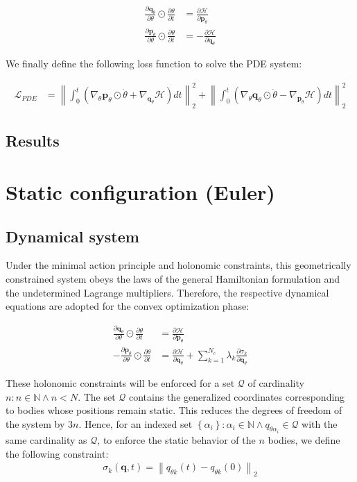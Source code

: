 \documentclass[draft]{agujournal2019}
\newcommand{\norm}[1]{\left\lVert#1\right\rVert}
\begin{document}
\begin{align}
    \frac{\partial \mathbf{q}_\theta}{\partial \theta} \odot \frac{\partial \theta}{\partial t} &= \frac{\partial \mathcal{H}}{\partial \mathbf{p}_\theta} \\
    \frac{\partial \mathbf{p}_\theta}{\partial \theta} \odot \frac{\partial \theta}{\partial t} &= - \frac{\partial \mathcal{H}}{\partial \mathbf{q}_\theta}
\end{align}

We finally define the following loss function to solve the PDE system:

\begin{align}
    \mathcal{L}_{PDE} &= \norm{\int_0^t \left(\nabla_\theta \mathbf{p}_\theta \odot \dot{\theta} + \nabla_{\mathbf{q}_\theta} \mathcal{H}\right) dt}_2^2 + \norm{\int_0^t \left(\nabla_\theta \mathbf{q}_\theta \odot \dot{\theta} - \nabla_{\mathbf{p}_\theta} \mathcal{H}\right) dt}^2_2
\end{align}

\subsection{Results}

\section{Static configuration (Euler)}
\subsection{Dynamical system}
Under the minimal action principle and holonomic constraints, this geometrically constrained system obeys the laws of the general Hamiltonian formulation and the undetermined Lagrange multipliers. Therefore, the respective dynamical equations are adopted for the convex optimization phase:

\begin{align}
    \frac{\partial \mathbf{q}_\theta}{\partial \theta} \odot \frac{\partial \theta}{\partial t} &= \frac{\partial \mathcal{H}}{\partial \mathbf{p}_\theta} \\
    - \frac{\partial \mathbf{p}_\theta}{\partial \theta} \odot \frac{\partial \theta}{\partial t} &= \frac{\partial \mathcal{H}}{\partial \mathbf{q}_\theta} + \sum_{k = 1}^{N_c} \lambda_k \frac{\partial \sigma_k}{\partial \mathbf{q}_\theta}
\end{align}

These holonomic constraints will be enforced for a set $\mathcal{Q}$ of cardinality $n \colon n \in \mathbb{N} \wedge n < N$. The set $\mathcal{Q}$ contains the generalized coordinates corresponding to bodies whose positions remain static. This reduces the degrees of freedom of the system by $3n$. Hence, for an indexed set $\left\{\alpha_i\right\} \colon \alpha_i \in \mathbb{N} \wedge q_{\theta\alpha_i} \in \mathcal{Q}$ with the same cardinality as $\mathcal{Q}$, to enforce the static behavior of the $n$ bodies, we define the following constraint:
\begin{align*}
    \sigma_k(\mathbf{q}, t) = \norm{q_{\theta k}(t) - q_{\theta k}(0)}_2
\end{align*}
\end{document}
